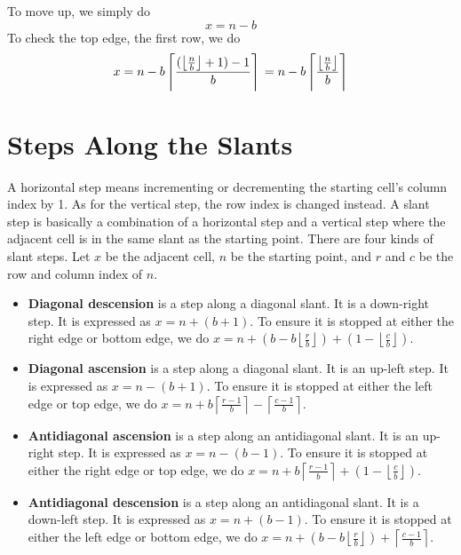 \documentclass[twoside,openany,12pt]{book}
\begin{document}
To move up, we simply do
    \begin{equation} 
      x = n - b
    \end{equation}
To check the top edge, the first row, we do
    \begin{equation}
      x = n - b\left\lceil \frac{(\left\lfloor \frac{n}{b} \right\rfloor + 1) - 1}{b} \right\rceil \\
        = n - b\left\lceil \frac{\left\lfloor \frac{n}{b} \right\rfloor}{b} \right\rceil
    \end{equation}

    \section{Steps Along the Slants} \label{slant_steps}
    A horizontal step means incrementing or decrementing the starting cell's column index by 1. As for the vertical step, the row index is changed instead. A slant step is basically a combination of a horizontal step and a vertical step where the adjacent cell is in the same slant as the starting point. There are four kinds of slant steps. Let $x$ be the adjacent cell, $n$ be the starting point, and $r$ and $c$ be the row and column index of $n$.
  \begin{itemize}
    \item \textbf{Diagonal descension} is a step along a diagonal slant. It is a down-right step. It is expressed as $x = n + (b + 1)$. To ensure it is stopped at either the right edge or bottom edge, we do $x = n + (b - b\left\lfloor \frac{r}{b} \right\rfloor) + (1 - \left\lfloor \frac{c}{b} \right\rfloor)$. 
    \item \textbf{Diagonal ascension} is a step along a diagonal slant. It is an up-left step. It is expressed as $x = n - (b + 1)$. To ensure it is stopped at either the left edge or top edge, we do $x = n + b\left\lceil \frac{r-1}{b} \right\rceil - \left\lceil \frac{c-1}{b} \right\rceil$. 
    \item \textbf{Antidiagonal ascension} is a step along an antidiagonal slant. It is an up-right step. It is expressed as $x = n - (b - 1)$. To ensure it is stopped at either the right edge or top edge, we do $x = n + b\left\lceil \frac{r-1}{b} \right\rceil + (1 - \left\lfloor \frac{c}{b} \right\rfloor)$. 
    \item \textbf{Antidiagonal descension} is a step along an antidiagonal slant. It is a down-left step. It is expressed as $x = n + (b - 1)$. To ensure it is stopped at either the left edge or bottom edge, we do $x = n + (b - b\left\lfloor \frac{r}{b} \right\rfloor) + \left\lceil \frac{c-1}{b} \right\rceil$. 

  \end{itemize}
    \newpage
\end{document}
